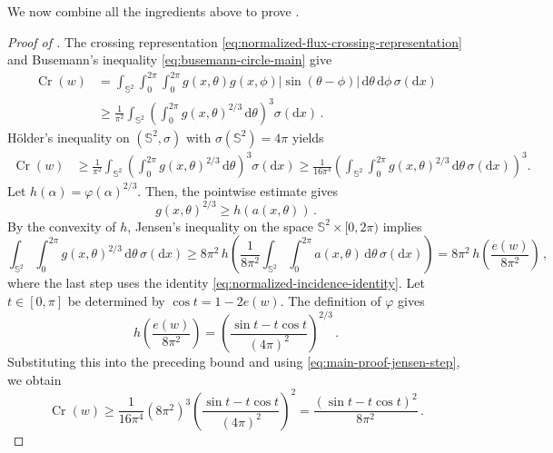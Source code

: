 \documentclass[reqno, 11pt]{amsart}
\theoremstyle{definition}
\newcommand{\abs}[1]{\left\lvert#1\right\rvert}
\newcommand{\dd}{\mathrm{d}}
\begin{document}
We now combine all the ingredients above to prove .



\begin{proof}[Proof of ]
The crossing representation \eqref{eq:normalized-flux-crossing-representation} and Busemann's inequality \eqref{eq:busemann-circle-main} give
\begin{align*}
    \operatorname{Cr}(w)&=\int_{{\mathbb S}^2}\int_0^{2\pi}\int_0^{2\pi}
        g(x,\theta)g(x,\phi)\abs{\sin(\theta-\phi)}
        \,\dd\theta\,\dd\phi\,\sigma(\dd x) \\
        &\geq  \frac1{\pi^2}\int_{{\mathbb S}^2} 
        \left(\int_0^{2\pi}g(x,\theta)^{2/3}\,\dd\theta\right)^3 \sigma(\dd x)\,.
\end{align*}
H\"older's inequality on \(({\mathbb S}^2,\sigma)\) with \(\sigma({\mathbb S}^2)=4\pi\) yields
\begin{align*}
    \operatorname{Cr}(w)&\geq  \frac1{\pi^2}\int_{{\mathbb S}^2} \left(\int_0^{2\pi}g(x,\theta)^{2/3}\,\dd\theta\right)^3 \sigma(\dd x) \geq \frac1{16\pi^4}\left(\int_{{\mathbb S}^2} \int_0^{2\pi}g(x,\theta)^{2/3}\,\dd\theta \,\sigma(\dd x) \right)^3.
\end{align*}
Let $h(\alpha) = \varphi(\alpha)^{2/3}$. Then, the pointwise estimate  gives 
\[
        g(x,\theta)^{2/3}\ge h(a(x,\theta))\,.
\]
By the convexity of \(h\), Jensen's inequality on the space
\({\mathbb S}^2\times[0,2\pi)\) implies
\begin{equation}\label{eq:main-proof-jensen-step}   \int_{{\mathbb S}^2}\int_0^{2\pi}g(x,\theta)^{2/3}\,\dd\theta\,\sigma(\dd x)
        \ge
        8\pi^2\,
        h\left(
        \frac1{8\pi^2}
        \int_{{\mathbb S}^2}\int_0^{2\pi}a(x,\theta)\,\dd\theta\,\sigma(\dd x)
        \right)  =8\pi^2\,h\left(\frac{e(w)}{8\pi^2}\right)\,,
\end{equation}
where the last step uses the identity \eqref{eq:normalized-incidence-identity}.
Let \(t\in[0,\pi]\) be determined by \(\cos t=1-2e(w)\).  The definition of \(\varphi\) gives
\[
        h\left(\frac{e(w)}{8\pi^2}\right)
        =
        \left(\frac{\sin t-t\cos t}{(4\pi)^2}\right)^{2/3}\,.
\]
Substituting this into the preceding bound and using \eqref{eq:main-proof-jensen-step}, we obtain
\[
        \operatorname{Cr}(w)
        \ge
        \frac1{16\pi^4}
        (8\pi^2)^3
        \left(\frac{\sin t-t\cos t}{(4\pi)^2}\right)^2
        =
        \frac{(\sin t-t\cos t)^2}{8\pi^2}\,.
\]
\end{proof}
\end{document}

